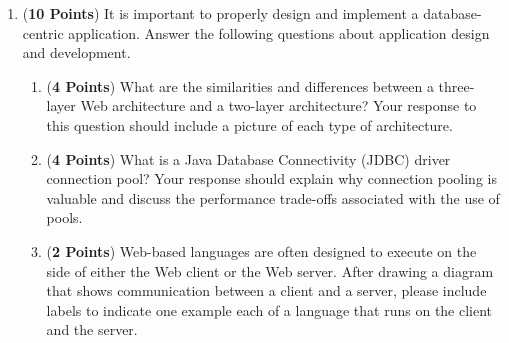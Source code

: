 \documentclass[12pt]{article}
\begin{document}
  \begin{enumerate}

    \item ({\bf 10 Points}) It is important to properly design and
      implement a database-centric application.  Answer the following
      questions about application design and development.

      \begin{enumerate}

        \item ({\bf 4 Points}) What are the similarities and differences between a three-layer Web architecture and a
          two-layer architecture?  Your response to this question should include a picture of each type of architecture.


          \item ({\bf 4 Points}) What is a Java Database Connectivity (JDBC) driver connection pool?  Your response
            should explain why connection pooling is valuable and discuss the performance trade-offs associated with the
            use of pools.

          \item ({\bf 2 Points}) Web-based languages are often designed to execute on the side of either the Web client
            or the Web server. After drawing a diagram that shows communication between a client and a server, please
            include labels to indicate one example each of a language that runs on the client and the server.



\end{enumerate}
\end{enumerate}
\end{document}
